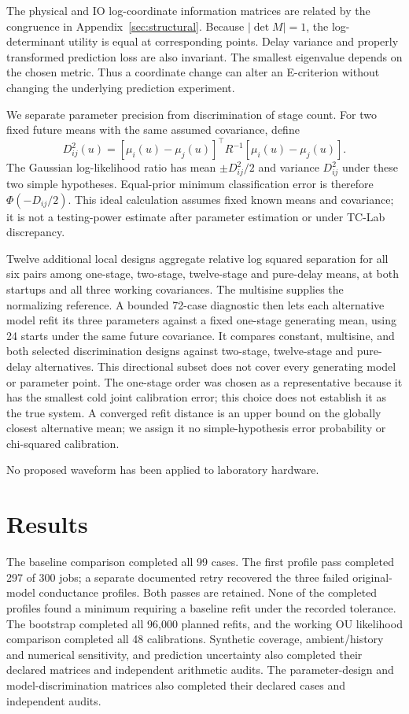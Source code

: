 \documentclass[11pt]{article}
\begin{document}
The physical and IO log-coordinate information matrices are related by the
congruence in Appendix~\ref{sec:structural}. Because $|\det M|=1$, the
log-determinant utility is equal at corresponding points. Delay variance and
properly transformed prediction loss are also invariant. The smallest
eigenvalue depends on the chosen metric. Thus a coordinate change can alter
an E-criterion without changing the underlying prediction experiment.

We separate parameter precision from discrimination of stage count. For two
fixed future means with the same assumed covariance, define
\[
 D_{ij}^2(u)=[\mu_i(u)-\mu_j(u)]^\top R^{-1}[\mu_i(u)-\mu_j(u)].
\]
The Gaussian log-likelihood ratio has mean $\pm D_{ij}^2/2$ and variance
$D_{ij}^2$ under these two simple hypotheses. Equal-prior minimum classification
error is therefore $\Phi(-D_{ij}/2)$. This ideal calculation assumes fixed known
means and covariance; it is not a testing-power estimate after parameter
estimation or under TC-Lab discrepancy.

Twelve additional local designs aggregate relative log squared separation for
all six pairs among one-stage, two-stage, twelve-stage and pure-delay means,
at both startups and all three working covariances. The multisine supplies the
normalizing reference. A bounded 72-case diagnostic then lets each alternative
model refit its three parameters against a fixed one-stage generating mean,
using 24 starts under the same future covariance. It compares constant,
multisine, and both selected discrimination designs against two-stage,
twelve-stage and pure-delay alternatives. This directional subset does not
cover every generating model or parameter point. The one-stage order was chosen
as a representative because it has the smallest cold joint calibration error;
this choice does not establish it as the true system. A converged refit distance
is an upper bound on the globally closest alternative mean; we assign it no
simple-hypothesis error probability or chi-squared calibration.

No proposed waveform has been applied to laboratory hardware.



\section{Results}
The baseline comparison completed all 99 cases. The first profile pass completed
297 of 300 jobs; a separate documented retry recovered the three failed
original-model conductance profiles. Both passes are retained. None of the
completed profiles found a minimum requiring a baseline refit under the recorded
tolerance. The bootstrap completed all 96,000 planned refits, and the working
OU likelihood comparison completed all 48 calibrations. Synthetic coverage, ambient/history and numerical sensitivity, and prediction uncertainty also completed their declared matrices and independent arithmetic audits. The parameter-design and model-discrimination matrices also completed their declared cases and independent audits.
\end{document}
